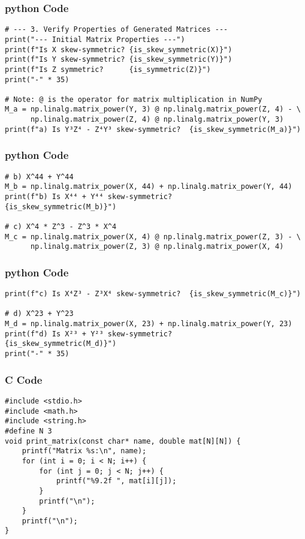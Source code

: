 \documentclass{beamer}
\begin{document}
\begin{frame}[fragile]
\frametitle{python Code}
\begin{lstlisting}
# --- 3. Verify Properties of Generated Matrices ---
print("--- Initial Matrix Properties ---")
print(f"Is X skew-symmetric? {is_skew_symmetric(X)}")
print(f"Is Y skew-symmetric? {is_skew_symmetric(Y)}")
print(f"Is Z symmetric?      {is_symmetric(Z)}")
print("-" * 35)

# Note: @ is the operator for matrix multiplication in NumPy
M_a = np.linalg.matrix_power(Y, 3) @ np.linalg.matrix_power(Z, 4) - \
      np.linalg.matrix_power(Z, 4) @ np.linalg.matrix_power(Y, 3)
print(f"a) Is Y³Z⁴ - Z⁴Y³ skew-symmetric?  {is_skew_symmetric(M_a)}")
\end{lstlisting}
\end{frame}

\begin{frame}[fragile]
\frametitle{python Code}
\begin{lstlisting}
# b) X^44 + Y^44
M_b = np.linalg.matrix_power(X, 44) + np.linalg.matrix_power(Y, 44)
print(f"b) Is X⁴⁴ + Y⁴⁴ skew-symmetric?      {is_skew_symmetric(M_b)}")

# c) X^4 * Z^3 - Z^3 * X^4
M_c = np.linalg.matrix_power(X, 4) @ np.linalg.matrix_power(Z, 3) - \
      np.linalg.matrix_power(Z, 3) @ np.linalg.matrix_power(X, 4)
\end{lstlisting}
\end{frame}

\begin{frame}[fragile]
\frametitle{python Code}
\begin{lstlisting}
print(f"c) Is X⁴Z³ - Z³X⁴ skew-symmetric?  {is_skew_symmetric(M_c)}")

# d) X^23 + Y^23
M_d = np.linalg.matrix_power(X, 23) + np.linalg.matrix_power(Y, 23)
print(f"d) Is X²³ + Y²³ skew-symmetric?      {is_skew_symmetric(M_d)}")
print("-" * 35)
\end{lstlisting}
\end{frame}

\begin{frame}[fragile]
\frametitle{C Code}
\begin{lstlisting}
#include <stdio.h>
#include <math.h>
#include <string.h>
#define N 3
void print_matrix(const char* name, double mat[N][N]) {
    printf("Matrix %s:\n", name);
    for (int i = 0; i < N; i++) {
        for (int j = 0; j < N; j++) {
            printf("%9.2f ", mat[i][j]);
        }
        printf("\n");
    }
    printf("\n");
}
\end{lstlisting}
\end{frame}
\end{document}

